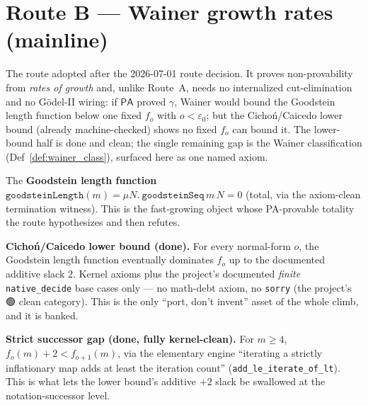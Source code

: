 \chapter{Route B --- Wainer growth rates (mainline)}\label{chp:routeB}

The route adopted after the 2026-07-01 route decision.  It proves non-provability from \emph{rates of
growth} and, unlike Route~A, needs no internalized cut-elimination and no Gödel-II wiring: if
\(\mathsf{PA}\) proved \(\gamma\), Wainer would bound the Goodstein length function below one fixed
\(f_o\) with \(o<\varepsilon_0\); but the Cichoń/Caicedo lower bound (already machine-checked) shows no
fixed \(f_o\) can bound it.  The lower-bound half is done and clean; the single remaining gap is the
Wainer classification (Def~\ref{def:wainer_class}), surfaced here as one named axiom.

\begin{definition}\label{def:goodstein_length}
  \leanok
The \textbf{Goodstein length function} \(\texttt{goodsteinLength}(m) = \mu N.\ \texttt{goodsteinSeq}\,m\,N = 0\)
(total, via the axiom-clean termination witness).  This is the fast-growing object whose PA-provable
totality the route hypothesizes and then refutes.
\end{definition}

\begin{theorem}\label{thm:dom_lower}
  \leanok
\textbf{Cichoń/Caicedo lower bound (done).}  For every normal-form \(o\), the Goodstein length function
eventually dominates \(f_o\) up to the documented additive slack \(2\).  Kernel axioms plus the
project's documented \emph{finite} \texttt{native\_decide} base cases only --- no math-debt axiom, no
\texttt{sorry} (the project's 🟢 clean category).  This is the only ``port, don't invent'' asset of the
whole climb, and it is banked.
\end{theorem}

\begin{lemma}\label{lem:succ_gap}
  \leanok
\textbf{Strict successor gap (done, fully kernel-clean).}  For \(m\ge 4\),
\(f_o(m) + 2 < f_{o+1}(m)\), via the elementary engine ``iterating a strictly inflationary map adds at
least the iteration count'' (\texttt{add\_le\_iterate\_of\_lt}).  This is what lets the lower bound's
additive \(+2\) slack be swallowed at the notation-successor level.
\end{lemma}

